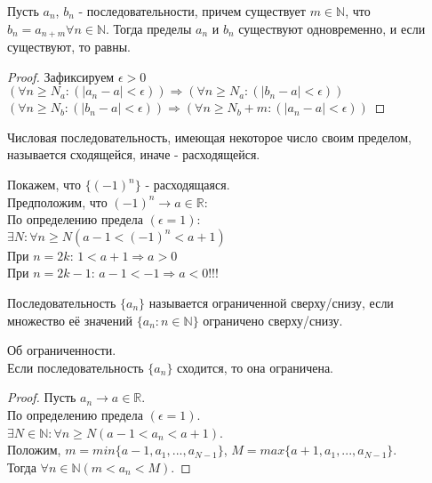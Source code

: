     \begin{note}
        Пусть ${a_{n}}$, ${b_{n}}$ - последовательности, причем существует $m \in \mathds{N}$, что $b_{n} = a_{n+m} \forall n \in \mathds{N}$.
        Тогда пределы ${a_{n}}$ и  ${b_{n}}$ существуют одновременно, и если существуют, то равны.
        \begin{proof}
            Зафиксируем $\epsilon > 0$\\
            $(\forall n \geq N_{a} : (|a_{n}-a| < \epsilon)) \Rightarrow (\forall n \geq N_{a} : (|b_{n}-a| < \epsilon))$\\
            $(\forall n \geq N_{b} : (|b_{n}-a| < \epsilon)) \Rightarrow (\forall n \geq N_{b}+m : (|a_{n}-a| < \epsilon))$
        \end{proof}
    \end{note}

    \begin{definition}
        Числовая последовательность, имеющая некоторое число своим пределом, называется сходящейся, иначе - расходящейся.
    \end{definition}

    \begin{example}
        Покажем, что $\{(-1)^{n}\}$ - расходящаяся.\\
        Предположим, что $(-1)^{n} \rightarrow a \in \mathds{R}$:\\
        По определению предела $(\epsilon = 1)$:\\
        $\exists N : \forall n \geq N (a-1 < (-1)^{n} < a+1)$\\
        При $n = 2k$: $1 < a+1 \Rightarrow a > 0$\\
        При $n = 2k-1$: $a-1 < -1 \Rightarrow a < 0$!!!
    \end{example}

    \begin{definition}
        Последовательность $\{a_{n}\}$ называется ограниченной сверху/снизу, если множество её значений $\{a_{n} : n \in \mathds{N}\}$ ограничено сверху/снизу.
    \end{definition}

    \begin{theorem}
        Об ограниченности.\\
        Если последовательность $\{a_{n}\}$ сходится, то она ограничена.
    \end{theorem}

    \begin{proof}
        Пусть $a_{n} \rightarrow a \in \mathds{R}$.\\
        По определению предела $(\epsilon = 1)$.\\
        $\exists N \in \mathds{N} : \forall n \geq N(a-1 < a_{n} < a+1)$.\\
        Положим, $m = min\{a-1, a_{1}, ..., a_{N-1}\}$, $M = max\{a+1, a_{1}, ..., a_{N-1}\}$.\\
        Тогда $\forall n \in \mathds{N} (m < a_{n} < M)$.
    \end{proof}

